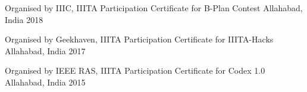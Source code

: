 

\begin{cventries}

  \cventry
    {Organised by IIIC, IIITA} %
    {Participation Certificate for B-Plan Contest} %
    {Allahabad, India} %
    {2018} %
    {
      \begin{cvitems} %
      \end{cvitems}
    }

\cventry
    {Organised by Geekhaven, IIITA} %
    {Participation Certificate for IIITA-Hacks} %
    {Allahabad, India} %
    {2017} %
    {
      \begin{cvitems} %
      \end{cvitems}
    }
  \cventry
    {Organised by IEEE RAS, IIITA} %
    {Participation Certificate for Codex 1.0} %
    {Allahabad, India} %
    {2015} %
    {
      \begin{cvitems} %
      \end{cvitems}
    }


\end{cventries}
